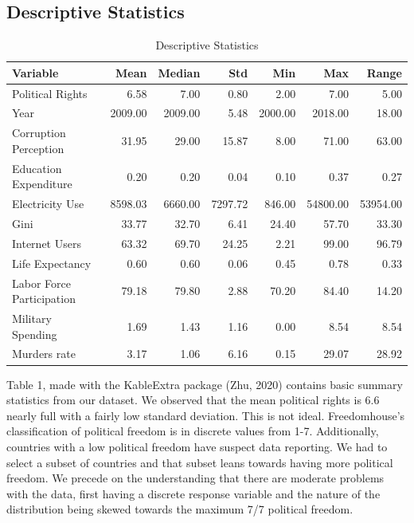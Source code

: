 \documentclass[
  english,
  man,floatsintext]{apa6}
\begin{document}
\hypertarget{descriptive-statistics}{%
\subsection{Descriptive Statistics}\label{descriptive-statistics}}

\begin{longtable}[t]{lrrrrrr}
\caption{\label{tab:unnamed-chunk-2}Descriptive Statistics}\\
\toprule
Variable & Mean & Median & Std & Min & Max & Range\\
\midrule
Political Rights & 6.58 & 7.00 & 0.80 & 2.00 & 7.00 & 5.00\\
Year & 2009.00 & 2009.00 & 5.48 & 2000.00 & 2018.00 & 18.00\\
Corruption Perception & 31.95 & 29.00 & 15.87 & 8.00 & 71.00 & 63.00\\
Education Expenditure & 0.20 & 0.20 & 0.04 & 0.10 & 0.37 & 0.27\\
Electricity Use & 8598.03 & 6660.00 & 7297.72 & 846.00 & 54800.00 & 53954.00\\
\addlinespace
Gini & 33.77 & 32.70 & 6.41 & 24.40 & 57.70 & 33.30\\
Internet Users & 63.32 & 69.70 & 24.25 & 2.21 & 99.00 & 96.79\\
Life Expectancy & 0.60 & 0.60 & 0.06 & 0.45 & 0.78 & 0.33\\
Labor Force Participation & 79.18 & 79.80 & 2.88 & 70.20 & 84.40 & 14.20\\
Military Spending & 1.69 & 1.43 & 1.16 & 0.00 & 8.54 & 8.54\\
\addlinespace
Murders rate & 3.17 & 1.06 & 6.16 & 0.15 & 29.07 & 28.92\\
\bottomrule
\end{longtable}

Table 1, made with the KableExtra package (Zhu, 2020) contains basic summary statistics from our dataset. We observed that the mean political rights is 6.6 nearly full with a fairly low standard deviation. This is not ideal. Freedomhouse's classification of political freedom is in discrete values from 1-7. Additionally, countries with a low political freedom have suspect data reporting. We had to select a subset of countries and that subset leans towards having more political freedom. We precede on the understanding that there are moderate problems with the data, first having a discrete response variable and the nature of the distribution being skewed towards the maximum 7/7 political freedom.
\end{document}
